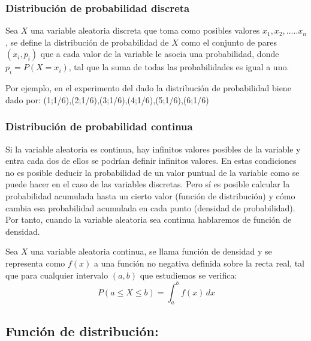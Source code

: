 \documentclass[
  12pt,
]{krantz}
\theoremstyle{definition}
\theoremstyle{definition}
\theoremstyle{definition}
\theoremstyle{remark}
\let\BeginKnitrBlock\begin \let\EndKnitrBlock\end
\begin{document}
\hypertarget{distribucion-de-probabilidad-discreta}{%
\subsubsection{Distribución de probabilidad discreta}\label{distribucion-de-probabilidad-discreta}}

Sea \(X\) una variable aleatoria discreta que toma como posibles valores \(x_1,x_2,.....x_n\), se define la distribución de probabilidad de \(X\) como el conjunto de pares \((x_i, p_i)\) que a cada valor de la variable le asocia una probabilidad, donde \(p_i= P(X=x_i)\), tal que la suma de todas las probabilidades es igual a uno.

Por ejemplo, en el experimento del dado la distribución de probabilidad biene dado por: (1;1/6),(2;1/6),(3;1/6),(4;1/6),(5;1/6),(6;1/6)

\hypertarget{distribucion-de-probabilidad-continua}{%
\subsubsection{Distribución de probabilidad continua}\label{distribucion-de-probabilidad-continua}}

Si la variable aleatoria es continua, hay infinitos valores posibles de la variable y entra cada dos de ellos se podrían definir infinitos valores. En estas condiciones no es posible deducir la probabilidad de un valor puntual de la variable como se puede hacer en el caso de las variables discretas. Pero sí es posible calcular la probabilidad acumulada hasta un cierto valor (función de distribución) y cómo cambia esa probabilidad acumulada en cada punto (densidad de probabilidad). Por tanto, cuando la variable aleatoria sea continua hablaremos de función de densidad.

\BeginKnitrBlock{definition}
\protect\hypertarget{def:defi-func-dens}{}{\label{def:defi-func-dens} }Sea \(X\) una variable aleatoria continua, se llama función de densidad y se representa como \(f(x)\) a una función no negativa definida sobre la recta real, tal que para cualquier intervalo \((a,b)\) que estudiemos se verifica: \[P(a\leq X \leq b) = \int_{a}^{b}  \! f(x) \, dx\]
\EndKnitrBlock{definition}

\hypertarget{funcion-de-distribucion}{%
\subsection{Función de distribución:}\label{funcion-de-distribucion}}
\end{document}
